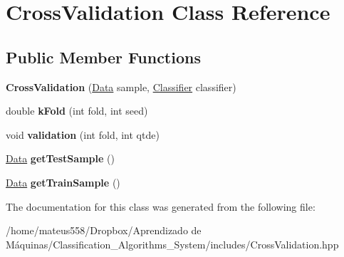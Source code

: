 \hypertarget{class_cross_validation}{}\section{Cross\+Validation Class Reference}
\label{class_cross_validation}
\subsection*{Public Member Functions}
\begin{DoxyCompactItemize}
\item 
\mbox{\label{class_cross_validation_af35049a91d0f930649368a540fc2820c}} 
{\bfseries Cross\+Validation} (\hyperlink{class_data}{Data} sample, \hyperlink{class_classifier}{Classifier} classifier)
\item 
\mbox{\label{class_cross_validation_a2b0f80b43a7cc4d0cb2ecf35ff753e02}} 
double {\bfseries k\+Fold} (int fold, int seed)
\item 
\mbox{\label{class_cross_validation_a23fcc984772d8e9041aefd5e936aac10}} 
void {\bfseries validation} (int fold, int qtde)
\item 
\mbox{\label{class_cross_validation_add4e6fd96aa64cd4397e4c86a83f6516}} 
\hyperlink{class_data}{Data} {\bfseries get\+Test\+Sample} ()
\item 
\mbox{\label{class_cross_validation_a2dfd4e1f68f5e4c318077ba839ad93c2}} 
\hyperlink{class_data}{Data} {\bfseries get\+Train\+Sample} ()
\end{DoxyCompactItemize}


The documentation for this class was generated from the following file\+:\begin{DoxyCompactItemize}
\item 
/home/mateus558/\+Dropbox/\+Aprendizado de Máquinas/\+Classification\+\_\+\+Algorithms\+\_\+\+System/includes/Cross\+Validation.\+hpp\end{DoxyCompactItemize}
